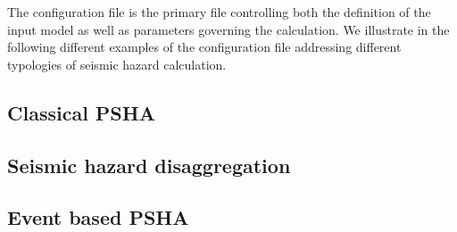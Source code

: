 The configuration file is the primary file controlling both the definition of
the input model as well as parameters governing the calculation. We illustrate
in the following different examples of the configuration file addressing
different typologies of seismic hazard calculation.


\subsection[Classical PSHA]{Classical PSHA}
\label{subsec:config_classical_psha}


\subsection{Seismic hazard disaggregation}
\label{subsec:config_hazard_disaggregation}


\subsection{Event based PSHA}

\label{subsec:config_event_based_psha}
